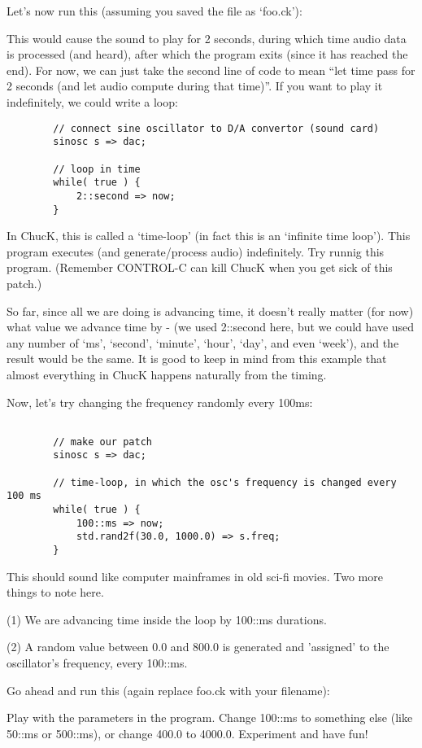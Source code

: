 Let's now run this (assuming you saved the file as `foo.ck'):


This would cause the sound to play for 2 seconds, during which time audio data is processed (and heard), after which the program exits (since it has reached the end). For now, we can just take the second line of code to mean ``let time pass for 2 seconds (and let audio compute during that time)''. If you want to play it indefinitely, we could write a loop:

\begin{verbatim}
        // connect sine oscillator to D/A convertor (sound card)
        sinosc s => dac;

        // loop in time
        while( true ) {
            2::second => now;
        }
\end{verbatim}

In ChucK, this is called a `time-loop' (in fact this is an `infinite time loop'). This program executes (and generate/process audio) indefinitely. Try runnig this program. (Remember CONTROL-C can kill ChucK when you get sick of this patch.)

So far, since all we are doing is advancing time, it doesn't really matter (for now) what value we advance time by - (we used 2::second here, but we could have used any number of `ms', `second', `minute', `hour', `day', and even `week'), and the result would be the same. It is good to keep in mind from this example that almost everything in ChucK happens naturally from the timing. 

Now, let's try changing the frequency randomly every 100ms:
\begin{verbatim}

        // make our patch
        sinosc s => dac;

        // time-loop, in which the osc's frequency is changed every 100 ms
        while( true ) {
            100::ms => now;
            std.rand2f(30.0, 1000.0) => s.freq;
        }
\end{verbatim}

This should sound like computer mainframes in old sci-fi movies. Two more things to note here. 

(1) We are advancing time inside the loop by 100::ms durations. 

(2) A random value between 0.0 and 800.0 is generated and 'assigned' to the oscillator's frequency, every 100::ms. 

Go ahead and run this (again replace foo.ck with your filename):

Play with the parameters in the program. Change 100::ms to something else (like 50::ms or 500::ms), or change 400.0 to 4000.0. Experiment and have fun!
